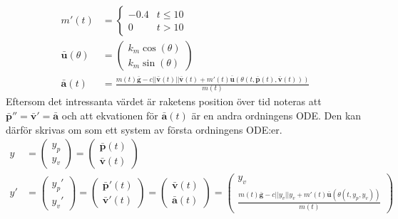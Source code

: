 \documentclass{article}
\newcommand{\bfbar}[1]{\ensuremath{\mathbf{\bar{#1}}}}
\begin{document}
\[
    \begin{aligned}
        m'(t)             & = \begin{cases}
                                  -0.4 & t \leq 10 \\
                                  0    & t > 10
                              \end{cases}                                                                                                     \\
        \bfbar{u}(\theta) & = \begin{pmatrix}
                                  k_m \cos(\theta) \\
                                  k_m \sin(\theta)
                              \end{pmatrix}                                                                                                     \\
        \bfbar{a}(t)      & = \frac{m(t) \bfbar{g} - c||\bfbar{v}(t)||\bfbar{v}(t) + m'(t) \bfbar{u}(\theta(t, \bfbar{p}(t), \bfbar{v}(t)))}{m(t)}
    \end{aligned}
\]
Eftersom det intressanta värdet är raketens position över tid noteras att \(\bfbar{p}''=\bfbar{v}'=\bfbar{a}\) och att ekvationen för \(\bfbar{a}(t)\) är en andra ordningens ODE. Den kan därför skrivas om som ett system av första ordningens ODE:er.
\[
    \begin{aligned}
        y  &
        = \begin{pmatrix}
              y_p \\
              y_v
          \end{pmatrix}
        =\begin{pmatrix}
             \bfbar{p}(t) \\
             \bfbar{v}(t)
         \end{pmatrix} \\
        y' &
        = \begin{pmatrix}
              y_p' \\
              y_v'
          \end{pmatrix}
        = \begin{pmatrix}
              \bfbar{p}'(t) \\
              \bfbar{v}'(t)
          \end{pmatrix}
        = \begin{pmatrix}
              \bfbar{v}(t) \\
              \bfbar{a}(t)
          \end{pmatrix}
        = \begin{pmatrix}
              y_v \\
              \frac{m(t) \bfbar{g} - c||y_v||y_v + m'(t) \bfbar{u}(\theta(t, y_p, y_v))}{m(t)}
          \end{pmatrix}
    \end{aligned}
\]
\end{document}
